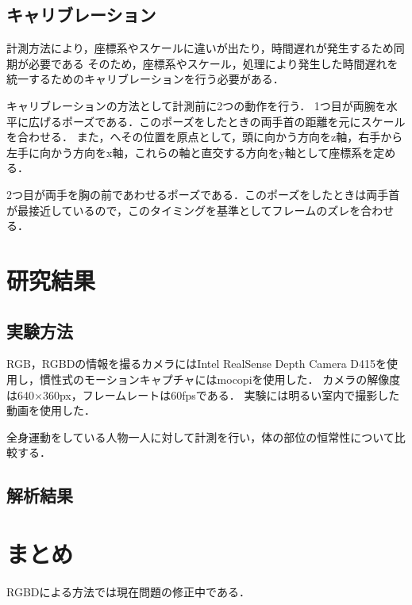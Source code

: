 \documentclass[titlepage]{jarticle}
\begin{document}
\subsection{キャリブレーション}
計測方法により，座標系やスケールに違いが出たり，時間遅れが発生するため同期が必要である
そのため，座標系やスケール，処理により発生した時間遅れを統一するためのキャリブレーションを行う必要がある．

キャリブレーションの方法として計測前に2つの動作を行う．
1つ目が両腕を水平に広げるポーズである．このポーズをしたときの両手首の距離を元にスケールを合わせる．
また，へその位置を原点として，頭に向かう方向をz軸，右手から左手に向かう方向をx軸，これらの軸と直交する方向をy軸として座標系を定める．

2つ目が両手を胸の前であわせるポーズである．このポーズをしたときは両手首が最接近しているので，このタイミングを基準としてフレームのズレを合わせる．
\section{研究結果}
\subsection{実験方法}
RGB，RGBDの情報を撮るカメラにはIntel RealSense Depth Camera D415を使用し，慣性式のモーションキャプチャにはmocopiを使用した．
カメラの解像度は640$\times$360px，フレームレートは60fpsである．
実験には明るい室内で撮影した動画を使用した．

全身運動をしている人物一人に対して計測を行い，体の部位の恒常性について比較する．
\subsection{解析結果}



\section{まとめ}
RGBDによる方法では現在問題の修正中である．
\begin{thebibliography}{99}
  \small{




  }
\end{thebibliography}
\end{document}
